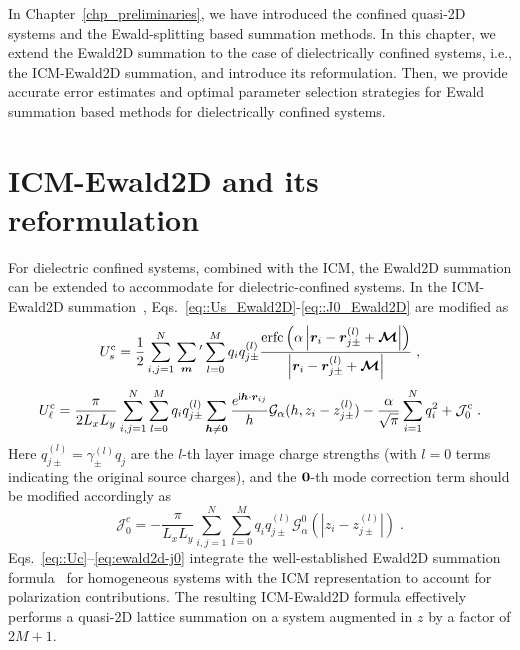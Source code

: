 In Chapter~\ref{chp_preliminaries}, we have introduced the confined quasi-2D systems and the Ewald-splitting based summation methods.
In this chapter, we extend the Ewald2D summation to the case of dielectrically confined systems, i.e., the ICM-Ewald2D summation, and introduce its reformulation.
Then, we provide accurate error estimates and optimal parameter selection strategies for Ewald summation based methods for dielectrically confined systems.

\section{ICM-Ewald2D and its reformulation}\label{sec::icm_ewald2d}

For dielectric confined systems, combined with the ICM, the Ewald2D summation can be extended to accommodate for dielectric-confined systems.
In the ICM-Ewald2D summation~\cite{gan2024random}, Eqs.~\eqref{eq::Us_Ewald2D}-\eqref{eq::J0_Ewald2D} are modified as
\begin{equation}\label{eq::Uc}
    U_{s}^{\text{c}} =  \frac{1}{2} \sum_{i,j=1}^N \sum_{\bm{m}}{}^\prime \sum_{l=0}^M q_iq_{j \pm}^{(l)} \frac{\text{erfc}\left(\alpha \left|\bm{r}_i - \bm{r}_{j\pm}^{(l)}+ \boldsymbol{\mathcal{M}}\right|\right)}{\left|\bm{r}_i-\bm{r}_{j\pm}^{(l)}+\boldsymbol{\mathcal{M}}\right|}\;,
\end{equation}
\begin{equation}\label{eq::Fourier2D}
    U^{\text{c}}_{\ell} =  \frac{\pi}{2L_xL_y}\sum_{i, j=1}^N \sum_{l = 0}^{M} q_iq_{j \pm}^{(l)} \sum_{\boldsymbol{h}\neq \boldsymbol{0}}\frac{e^{\mathsf i \boldsymbol{h}\cdot \boldsymbol{r}_{ij}}}{h}\mathcal{G}_{\alpha}(h,z_i - z_{j \pm}^{(l)})  - \frac{\alpha}{\sqrt{\pi}}\sum_{i=1}^{N}q_i^2+\mathcal{J}^{\text{c}}_0\;.
\end{equation}
Here $q_{j\pm}^{(l)}=\gamma_{\pm}^{(l)}q_j$ are the $l$-th layer image charge  strengths (with $l = 0$ terms indicating the original source charges), and the $\boldsymbol{0}$-th mode correction term should be modified accordingly as 
\begin{equation}\label{eq:ewald2d-j0}
    \mathcal J_0^c = -\frac{\pi}{L_xL_y}\sum_{i,j=1}^{N}\sum_{l=0}^{M} q_iq_{j\pm}^{(l)}\mathcal{G}_{\alpha}^0(|z_i-z_{j\pm}^{(l)}|)\;.
\end{equation}
Eqs.~\eqref{eq::Uc}--\eqref{eq:ewald2d-j0} integrate the well-established Ewald2D summation formula~\cite{parry1975electrostatic,zhonghanhu2014JCTC} for homogeneous systems with the ICM representation to account for polarization contributions. 
The resulting ICM-Ewald2D formula effectively performs a quasi-2D lattice summation on a system augmented in $z$ by a factor of $2M+1$. 
